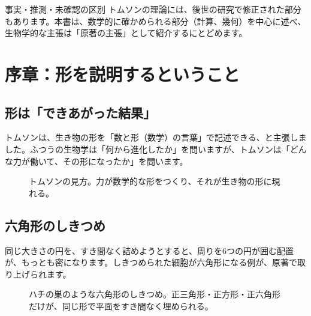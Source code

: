 \documentclass[a4paper,11pt,openany]{ltjsbook}
\begin{document}
\begin{notebox}{事実・推測・未確認の区別}
トムソンの理論には、後世の研究で修正された部分もあります。本書は、数学的に確かめられる部分（計算、幾何）を中心に述べ、生物学的な主張は「原著の主張」として紹介するにとどめます。
\end{notebox}

\chapter{序章：形を説明するということ}

\section{形は「できあがった結果」}

トムソンは、生き物の形を「数と形（数学）の言葉」で記述できる、と主張しました。ふつうの生物学は「何から進化したか」を問いますが、トムソンは「どんな力が働いて、その形になったか」を問います。

\begin{figure}[htbp]
\centering
{}
\caption{トムソンの見方。力が数学的な形をつくり、それが生き物の形に現れる。}
\end{figure}

\section{六角形のしきつめ}

同じ大きさの円を、すき間なく詰めようとすると、周りを6つの円が囲む配置が、もっとも密になります。しきつめられた細胞が六角形になる例が、原著で取り上げられます。

\begin{figure}[htbp]
\centering
{}
\caption{ハチの巣のような六角形のしきつめ。正三角形・正方形・正六角形だけが、同じ形で平面をすき間なく埋められる。}
\end{figure}
\end{document}
